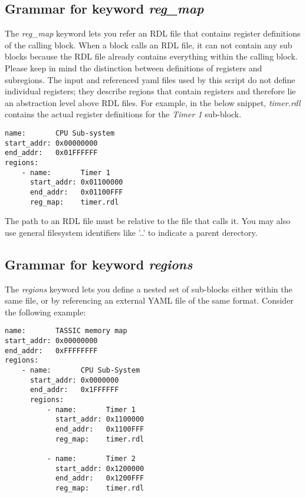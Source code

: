 \documentclass{tropic_design_spec}
\begin{document}
\subsection{Grammar for keyword \textit{reg_map}}
The \textit{reg_map} keyword lets you refer an RDL file that contains register definitions
of the calling block. When a block calls an RDL file, it can not contain any sub blocks
because the RDL file already contains everything within the calling block.
\newline
Please keep in mind the distinction between definitions of registers and subregions.
The input and referenced yaml files used by this script do not define individual registers;
they describe regions that contain registers and therefore lie an abstraction level
above RDL files.
\newline
For example, in the below snippet, \textit{timer.rdl} contains the actual register definitions
for the \textit{Timer 1} sub-block.

\begin{lstlisting}
name:       CPU Sub-system
start_addr: 0x00000000
end_addr:   0x01FFFFFF
regions:
    - name:       Timer 1
      start_addr: 0x01100000
      end_addr:   0x01100FFF
      reg_map:    timer.rdl
\end{lstlisting}

The path to an RDL file must be relative to the file that calls it. You may also use general
filesystem identifiers like '..' to indicate a parent derectory.

\pagebreak
\subsection{Grammar for keyword \textit{regions}}
The \textit{regions} keyword lets you define a nested set of sub-blocks either within the
same file, or by referencing an external YAML file of the same format. Consider the following 
example:

\begin{lstlisting}
name:       TASSIC memory map
start_addr: 0x00000000
end_addr:   0xFFFFFFFF
regions:
    - name:       CPU Sub-System
      start_addr: 0x0000000
      end_addr:   0x1FFFFFF
      regions:
          - name:       Timer 1
            start_addr: 0x1100000
            end_addr:   0x1100FFF
            reg_map:    timer.rdl

          - name:       Timer 2
            start_addr: 0x1200000
            end_addr:   0x1200FFF
            reg_map:    timer.rdl
\end{lstlisting}
\end{document}
